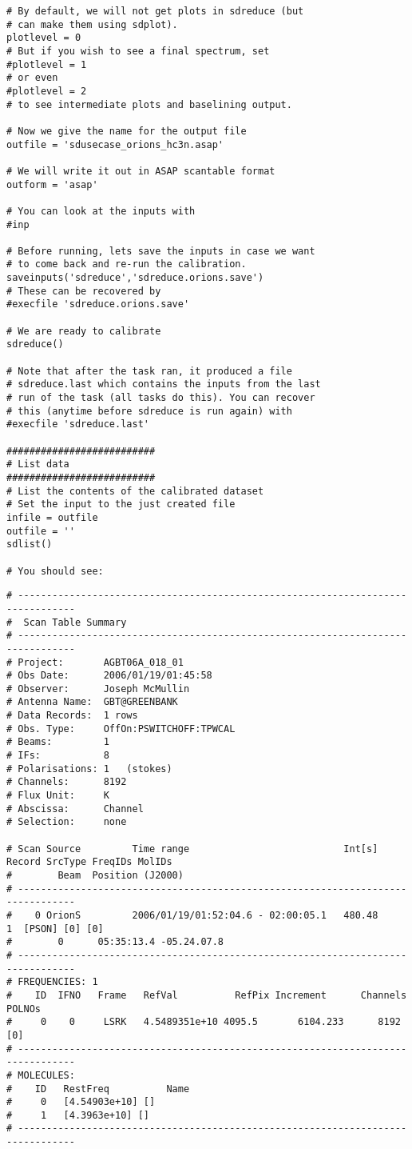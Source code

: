 \begin{verbatim}
# By default, we will not get plots in sdreduce (but
# can make them using sdplot).
plotlevel = 0
# But if you wish to see a final spectrum, set
#plotlevel = 1
# or even
#plotlevel = 2
# to see intermediate plots and baselining output.

# Now we give the name for the output file
outfile = 'sdusecase_orions_hc3n.asap'

# We will write it out in ASAP scantable format
outform = 'asap'

# You can look at the inputs with
#inp

# Before running, lets save the inputs in case we want
# to come back and re-run the calibration.
saveinputs('sdreduce','sdreduce.orions.save')
# These can be recovered by
#execfile 'sdreduce.orions.save'

# We are ready to calibrate
sdreduce()

# Note that after the task ran, it produced a file
# sdreduce.last which contains the inputs from the last
# run of the task (all tasks do this). You can recover
# this (anytime before sdreduce is run again) with
#execfile 'sdreduce.last'

##########################
# List data
##########################
# List the contents of the calibrated dataset
# Set the input to the just created file
infile = outfile
outfile = ''
sdlist()

# You should see:
\end{verbatim}
\footnotesize
\begin{verbatim}
# --------------------------------------------------------------------------------
#  Scan Table Summary
# --------------------------------------------------------------------------------
# Project:       AGBT06A_018_01
# Obs Date:      2006/01/19/01:45:58
# Observer:      Joseph McMullin
# Antenna Name:  GBT@GREENBANK
# Data Records:  1 rows
# Obs. Type:     OffOn:PSWITCHOFF:TPWCAL
# Beams:         1   
# IFs:           8   
# Polarisations: 1   (stokes)
# Channels:      8192
# Flux Unit:     K
# Abscissa:      Channel
# Selection:     none

# Scan Source         Time range                           Int[s] Record SrcType FreqIDs MolIDs 
#        Beam  Position (J2000)       
# --------------------------------------------------------------------------------
#    0 OrionS         2006/01/19/01:52:04.6 - 02:00:05.1   480.48     1  [PSON] [0] [0]
#        0      05:35:13.4 -05.24.07.8
# --------------------------------------------------------------------------------
# FREQUENCIES: 1
#    ID  IFNO   Frame   RefVal          RefPix Increment      Channels POLNOs
#     0    0     LSRK   4.5489351e+10 4095.5       6104.233      8192  [0]
# --------------------------------------------------------------------------------
# MOLECULES: 
#    ID   RestFreq          Name           
#     0   [4.54903e+10] []
#     1   [4.3963e+10] []
# --------------------------------------------------------------------------------
\end{verbatim}
